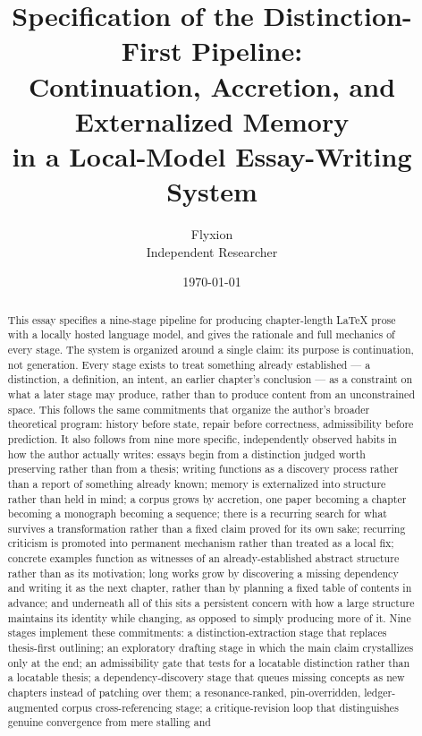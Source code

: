 \documentclass[11pt]{article}
\title{Specification of the Distinction-First Pipeline: \\
Continuation, Accretion, and Externalized Memory \\
in a Local-Model Essay-Writing System}
\author{Flyxion \\ \small Independent Researcher}
\date{\today}
\theoremstyle{definition}
\begin{document}
\maketitle

\begin{abstract}
This essay specifies a nine-stage pipeline for producing chapter-length
LaTeX prose with a locally hosted language model, and gives the
rationale and full mechanics of every stage. The system is organized
around a single claim: its purpose is continuation, not generation.
Every stage exists to treat something already established --- a
distinction, a definition, an intent, an earlier chapter's conclusion
--- as a constraint on what a later stage may produce, rather than to
produce content from an unconstrained space. This follows the same
commitments that organize the author's broader theoretical program:
history before state, repair before correctness, admissibility before
prediction. It also follows from nine more specific, independently
observed habits in how the author actually writes: essays begin from a
distinction judged worth preserving rather than from a thesis; writing
functions as a discovery process rather than a report of something
already known; memory is externalized into structure rather than held
in mind; a corpus grows by accretion, one paper becoming a chapter
becoming a monograph becoming a sequence; there is a recurring search
for what survives a transformation rather than a fixed claim proved for
its own sake; recurring criticism is promoted into permanent mechanism
rather than treated as a local fix; concrete examples function as
witnesses of an already-established abstract structure rather than as
its motivation; long works grow by discovering a missing dependency and
writing it as the next chapter, rather than by planning a fixed table
of contents in advance; and underneath all of this sits a persistent
concern with how a large structure maintains its identity while
changing, as opposed to simply producing more of it. Nine stages
implement these commitments: a distinction-extraction stage that
replaces thesis-first outlining; an exploratory drafting stage in which
the main claim crystallizes only at the end; an admissibility gate that
tests for a locatable distinction rather than a locatable thesis; a
dependency-discovery stage that queues missing concepts as new chapters
instead of patching over them; a resonance-ranked, pin-overridden,
ledger-augmented corpus cross-referencing stage; a critique-revision
loop that distinguishes genuine convergence from mere stalling and

\end{abstract}
\end{document}

